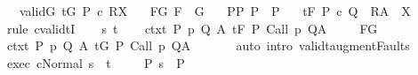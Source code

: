 \begin{isabellebody}
\ \ \ validG{\isacharcolon}\ {\isachardoublequoteopen}{\isasymGamma}{\isacharcomma}{\isasymTheta}{\isasymTurnstile}\isactrlsub t\isactrlbsub {\isacharslash}G\isactrlesub \ P{\isacharprime}\ c\ R{\isacharcomma}X{\isachardoublequoteclose}\isanewline
\ \ \ F{\isacharunderscore}G{\isacharcolon}\ {\isachardoublequoteopen}F\ {\isasymsubseteq}\ G{\isachardoublequoteclose}\isanewline
\ \ \ P{\isacharunderscore}P{\isacharprime}{\isacharcolon}\ {\isachardoublequoteopen}P\ {\isasymsubseteq}\ P{\isacharprime}{\isachardoublequoteclose}\isanewline
\ \ \ {\isachardoublequoteopen}{\isasymGamma}{\isacharcomma}{\isasymTheta}{\isasymTurnstile}\isactrlsub t\isactrlbsub {\isacharslash}F\isactrlesub \ P\ c\ {\isacharparenleft}Q\ {\isasyminter}\ R{\isacharparenright}{\isacharcomma}{\isacharparenleft}A\ {\isasyminter}\ X{\isacharparenright}{\isachardoublequoteclose}\isanewline
%
\isadelimproof
%
\endisadelimproof
%
\isatagproof
{}\isamarkupfalse%
\ {\isacharparenleft}rule\ cvalidtI{\isacharparenright}\isanewline
\ \ \isamarkupfalse%
\ s\ t\isanewline
\ \ \isamarkupfalse%
\ ctxt{\isacharcolon}\ {\isachardoublequoteopen}{\isasymforall}{\isacharparenleft}P{\isacharcomma}\ p{\isacharcomma}\ Q{\isacharcomma}\ A{\isacharparenright}{\isasymin}{\isasymTheta}{\isachardot}\ {\isasymGamma}{\isasymTurnstile}\isactrlsub t\isactrlbsub {\isacharslash}F\isactrlesub \ P\ {\isacharparenleft}Call\ p{\isacharparenright}\ Q{\isacharcomma}A{\isachardoublequoteclose}\ \isanewline
\ \ \isamarkupfalse%
\ F{\isacharunderscore}G\ \isamarkupfalse%
\ ctxt{\isacharprime}{\isacharcolon}\ {\isachardoublequoteopen}{\isasymforall}{\isacharparenleft}P{\isacharcomma}\ p{\isacharcomma}\ Q{\isacharcomma}\ A{\isacharparenright}{\isasymin}{\isasymTheta}{\isachardot}\ {\isasymGamma}{\isasymTurnstile}\isactrlsub t\isactrlbsub {\isacharslash}G\isactrlesub \ P\ {\isacharparenleft}Call\ p{\isacharparenright}\ Q{\isacharcomma}A{\isachardoublequoteclose}\ \isanewline
\ \ \ \ \isamarkupfalse%
\ {\isacharparenleft}auto\ intro{\isacharcolon}\ validt{\isacharunderscore}augment{\isacharunderscore}Faults{\isacharparenright}\isanewline
\ \ \isamarkupfalse%
\ exec{\isacharcolon}\ {\isachardoublequoteopen}{\isasymGamma}{\isasymturnstile}{\isasymlangle}c{\isacharcomma}Normal\ s{\isasymrangle}\ {\isasymRightarrow}\ t{\isachardoublequoteclose}\ \isanewline
\ \ \isamarkupfalse%
\ P{\isacharcolon}\ {\isachardoublequoteopen}s\ {\isasymin}\ P{\isachardoublequoteclose}\ \isanewline

\end{isabellebody}
